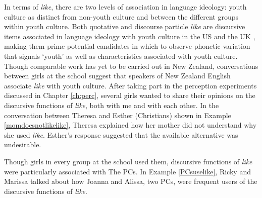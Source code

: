 In terms of \textit{like}, there are two levels of association in language ideology: youth culture as distinct from non-youth culture and between the different groups within youth culture. Both quotative and discourse particle \textit{like} are discursive items associated in language ideology with youth culture in the US and the UK \citep{daileyocain2000,buchstaller2006}, making them prime potential candidates in which to observe phonetic variation that signals `youth' as well as characteristics associated with youth culture. Though comparable work has yet to be carried out in New Zealand, conversations between girls at the school suggest that speakers of New Zealand English associate \textit{like} with youth culture. After taking part in the perception experiments discussed in Chapter \ref{ch:perc}, several girls wanted to share their opinions on the discursive functions of \textit{like}, both with me and with each other. In the conversation between Theresa and Esther (Christians) shown in Example \ref{momdoesnotlikelike}, Theresa explained how her mother did not understand why she used \textit{like}. Esther's response suggested that the available alternative was undesirable.



\label{momdoesnotlikelike}
\vspace{5 mm}


\noindent Though girls in every group at the school used them, discursive functions of \textit{like} were particularly associated with The PCs.  In Example \ref{PCsuselike}, Ricky and Marissa talked about how Joanna and Alissa, two PCs, were frequent users of the discursive functions of \textit{like}.

